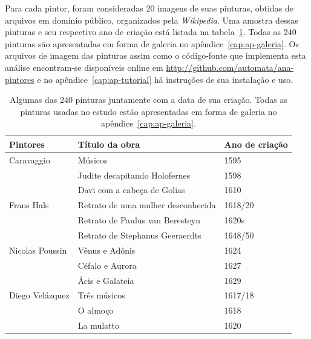 Para cada pintor, foram consideradas 20 imagens de suas pinturas,
obtidas de arquivos em domínio público, organizados pela
\textit{Wikipedia}. Uma amostra dessas pinturas e seu respectivo ano de criação
está listada na tabela~\ref{tab:paintings}. Todas as 240 pinturas são
apresentadas em forma de galeria no apêndice~\ref{cap:ap-galeria}. Os
arquivos de imagem das pinturas assim como o código-fonte que
implementa esta análise encontram-se disponíveis online em
\url{http://github.com/automata/ana-pintores} e no
apêndice~\ref{cap:ap-tutorial} há instruções de sua instalação e uso.

\begin{table}[h!] 
  \begin{center}
  \caption{\label{tab:paintings} Algumas das 240 pinturas juntamente
    com a data de sua criação. Todas as pinturas usadas no estudo
    estão apresentadas em forma de galeria no
    apêndice~\ref{cap:ap-galeria}.}

\begin{tabular}{l|l|l}
\hline \hline

 \textbf{Pintores} & \textbf{Título da obra}                       & \textbf{Ano de criação} \\ 
 
 \hline

 Caravaggio          & Músicos & 1595 \\
                     & Judite decapitando Holofernes & 1598 \\
                     & Davi com a cabeça de Golias & 1610 \\
                      
 Frans Hals          & Retrato de uma mulher desconhecida & 1618/20 \\
                     & Retrato de Paulus van Beresteyn & 1620s \\
                     & Retrato de Stephanus Geeraerdts & 1648/50 \\

 Nicolas Poussin     & Vênus e Adônis & 1624 \\
                     & Céfalo e Aurora & 1627 \\
                     & Ácis e Galateia & 1629 \\
 
 Diego Velázquez     & Três músicos & 1617/18 \\
                     & O almoço & 1618 \\
                     & La mulatto & 1620 \\
 

\end{tabular}
\end{center}
\end{table}
